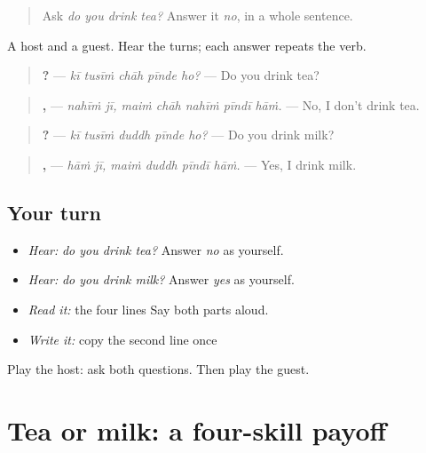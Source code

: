 \begin{quote}
Ask \emph{do you drink tea?} Answer it \emph{no}, in a whole sentence.
\end{quote}

\begin{grammarlens}[title={Grammar Lens: four lines}]
A host and a guest. Hear the turns; each answer repeats the verb.

\begin{quote}
\textbf{    ?} — \emph{kī tusīṁ chāh pīnde ho?} — Do you drink tea?
\end{quote}

\begin{quote}
\textbf{ ,     } — \emph{nahīṁ jī, maiṁ chāh nahīṁ pīndī hāṁ.} — No, I don't drink tea.
\end{quote}

\begin{quote}
\textbf{    ?} — \emph{kī tusīṁ duddh pīnde ho?} — Do you drink milk?
\end{quote}

\begin{quote}
\textbf{ ,    } — \emph{hāṁ jī, maiṁ duddh pīndī hāṁ.} — Yes, I drink milk.
\end{quote}
\end{grammarlens}

\subsection*{Your turn}
\begin{itemize}
\raggedright
  \item \emph{Hear:} \emph{do you drink tea?} Answer \emph{no} as yourself.
  \item \emph{Hear:} \emph{do you drink milk?} Answer \emph{yes} as yourself.
  \item \emph{Read it:} the four lines Say both parts aloud.
  \item \emph{Write it:} copy the second line once
\end{itemize}

\begin{tcolorbox}[breakable,colback=teal!4,colframe=teal!35!black,title={Before you move on}]
Play the host: ask both questions. Then play the guest.
\end{tcolorbox}
\section[\texorpdfstring{\pa{ਕੀ} \pa{ਤੁਸੀਂ} \pa{ਚਾਹ} \pa{ਪੀਂਦੇ} \pa{ਹੋ}? (kī tusīṁ chāh …)}{ਕੀ ਤੁਸੀਂ ਚਾਹ ਪੀਂਦੇ ਹੋ? (kī tusīṁ chāh …)}]{Tea or milk: a four-skill payoff}


